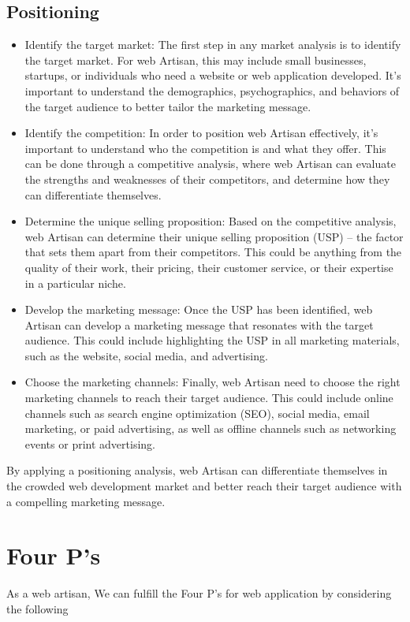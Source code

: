 \documentclass[12pt,a4paper]{article}
\begin{document}
\subsection{Positioning}
\begin{itemize}
    \item Identify the target market: The first step in any market analysis is to identify the target market. For web Artisan, this may include small businesses, startups, or individuals who need a website or web application developed. It's important to understand the demographics, psychographics, and behaviors of the target audience to better tailor the marketing message.
    \item Identify the competition: In order to position web Artisan effectively, it's important to understand who the competition is and what they offer. This can be done through a competitive analysis, where web Artisan can evaluate the strengths and weaknesses of their competitors, and determine how they can differentiate themselves.
    \item Determine the unique selling proposition: Based on the competitive analysis, web Artisan can determine their unique selling proposition (USP) – the factor that sets them apart from their competitors. This could be anything from the quality of their work, their pricing, their customer service, or their expertise in a particular niche.
     \item Develop the marketing message: Once the USP has been identified, web Artisan can develop a marketing message that resonates with the target audience. This could include highlighting the USP in all marketing materials, such as the website, social media, and advertising.
      \item Choose the marketing channels: Finally, web Artisan need to choose the right marketing channels to reach their target audience. This could include online channels such as search engine optimization (SEO), social media, email marketing, or paid advertising, as well as offline channels such as networking events or print advertising.
\end{itemize}
By applying a positioning analysis, web Artisan can differentiate themselves in the crowded web development market and better reach their target audience with a compelling marketing message.
\section{Four P's}
As a web artisan, We can fulfill the Four P's for web application by considering the following
\end{document}
